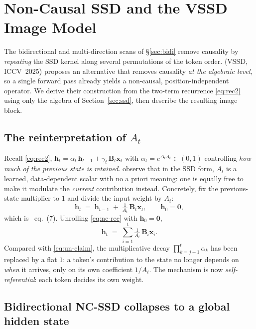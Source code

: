 \documentclass[11pt,a4paper]{article}
\begin{document}
\section{Non-Causal SSD and the VSSD Image Model}
\label{sec:ncssd}

The bidirectional and multi-direction scans of \S\ref{sec:bidi}
remove causality by \emph{repeating} the SSD kernel along several
permutations of the token order. \cite{vssd} (VSSD, ICCV~2025)
proposes an alternative that removes causality \emph{at the algebraic
level}, so a single forward pass already yields a non-causal,
position-independent operator. We derive their construction from the
two-term recurrence \eqref{eq:rec2} using only the algebra of
Section~\ref{sec:ssd}, then describe the resulting image block.

\subsection{The reinterpretation of $A_t$}

Recall \eqref{eq:rec2}, $\bm{h}_t = \alpha_t\,\bm{h}_{t-1}
+ \gamma_t\,\bm{B}_t\bm{x}_t$ with $\alpha_t = e^{\Delta_t A_t}\in
(0,1)$ controlling \emph{how much of the previous state is retained}.
\cite{vssd} observe that in the SSD form, $A_t$ is a learned,
data-dependent scalar with no a priori meaning: one is equally free to
make it modulate the \emph{current} contribution instead. Concretely,
fix the previous-state multiplier to $1$ and divide the input weight
by $A_t$:
\begin{equation}\label{eq:nc-rec}
  \bm{h}_t \;=\; \bm{h}_{t-1} \;+\; \tfrac{1}{A_t}\,\bm{B}_t\bm{x}_t,
  \qquad \bm{h}_0 = \bm{0},
\end{equation}
which is \cite{vssd}~eq.~(7). Unrolling \eqref{eq:nc-rec} with
$\bm{h}_0=\bm{0}$,
\begin{equation}\label{eq:nc-unroll}
  \bm{h}_t \;=\; \sum_{i=1}^{t} \tfrac{1}{A_i}\,\bm{B}_i\bm{x}_i.
\end{equation}
Compared with \eqref{eq:un-claim}, the multiplicative decay
$\prod_{k=j+1}^{t}\alpha_k$ has been replaced by a flat $1$: a token's
contribution to the state no longer depends on \emph{when} it
arrives, only on its own coefficient $1/A_i$. The mechanism is now
\emph{self-referential}: each token decides its own weight.

\subsection{Bidirectional NC-SSD collapses to a global hidden state}
\end{document}
